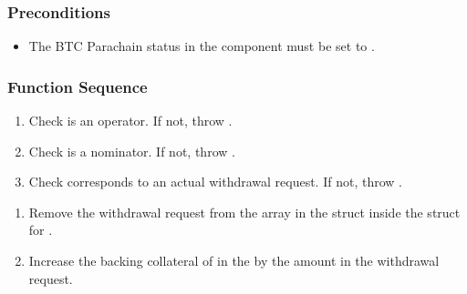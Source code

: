 \documentclass[a4paper,10pt,english]{sphinxmanual}
\begin{document}
\subsubsection{Preconditions}
\label{\detokenize{spec/nomination:id39}}\begin{itemize}
\item {} 
The BTC Parachain status in the {\hyperref[\detokenize{spec/security:security}]{}} component must be set to .

\end{itemize}


\subsubsection{Function Sequence}
\label{\detokenize{spec/nomination:id40}}\begin{enumerate}
%
\item {} 
Check  is an operator. If not, throw .

\item {} 
Check  is a nominator. If not, throw .

\item {} 
Check  corresponds to an actual withdrawal request. If not, throw .

\end{enumerate}
\begin{enumerate}
%
\setcounter{enumi}{2}
\item {} 
Remove the withdrawal request from the  array in the  struct inside the  struct for .

\item {} 
Increase the backing collateral of  in the {\hyperref[\detokenize{spec/vault-registry:vault-registry}]{}} by the amount in the withdrawal request.

\end{enumerate}
\end{document}
